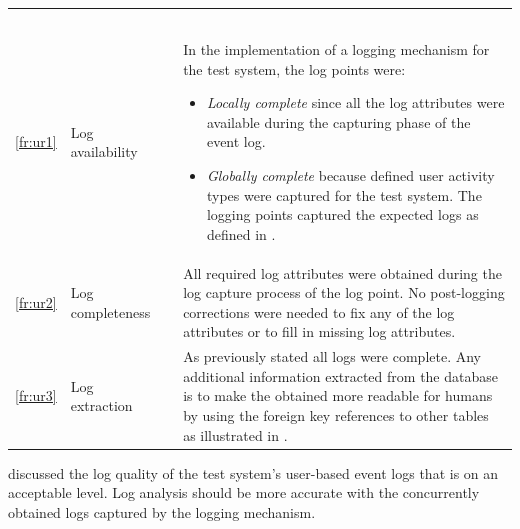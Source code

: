 \begin{xltabular}{\textwidth}{clcX}
	\caption[Logging quality assessment of the test system]{\textit{Logging quality assessment of the test system}}\label{tbl:ch3_testLoggingQuality}\\
	\toprule
	 &  &  &  \\
	\midrule
	\endfirsthead

	\caption[]{\continueCaption} \\
	\toprule
	 &  &  &  \\
	\midrule
	\endhead

	\midrule
	 \\ 
	\endfoot
	\endlastfoot

	\ref{fr:ur1} & Log availability & \cmark & \RaggedRight In the implementation of a logging mechanism for the test system, the log points were:
		\begin{itemize}
			\item \textit{Locally complete} since all the log attributes were available during the capturing phase of the event log.
			\item \textit{Globally complete} because defined user activity types were captured for the test system. The logging points captured the expected logs as defined in .
		\end{itemize} \\
	\ref{fr:ur2} & Log completeness & \cmark & All required log attributes were obtained during the log capture process of the log point. No post-logging corrections were needed to fix any of the log attributes or to fill in missing log attributes. \\
	\ref{fr:ur3} & Log extraction & \cmark & As previously stated all logs were complete. Any additional information extracted from the database is to make the obtained more readable for humans by using the foreign key references to other tables as illustrated in . \\
	\bottomrule
\end{xltabular}

 discussed the log quality of the test system's user-based event logs that is on an acceptable level. Log analysis should be more accurate with the concurrently obtained logs captured by the logging mechanism.

